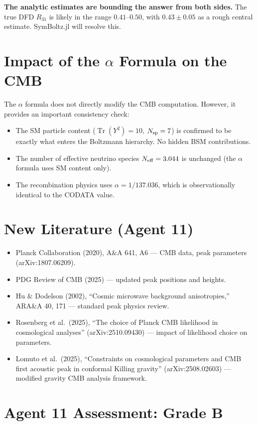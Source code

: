 \documentclass[11pt,a4paper]{article}
\newcommand{\Tr}{\operatorname{Tr}}
\begin{document}
\textbf{The analytic estimates are bounding the answer from both sides.} The true DFD $R_{31}$ is likely in the range $0.41$--$0.50$, with $0.43 \pm 0.05$ as a rough central estimate. SymBoltz.jl will resolve this.

\section{Impact of the $\alpha$ Formula on the CMB}

The $\alpha$ formula does not directly modify the CMB computation. However, it provides an important consistency check:
\begin{itemize}
\item The SM particle content ($\Tr(Y^2) = 10$, $N_{\rm sp} = 7$) is confirmed to be exactly what enters the Boltzmann hierarchy. No hidden BSM contributions.
\item The number of effective neutrino species $N_{\rm eff} = 3.044$ is unchanged (the $\alpha$ formula uses SM content only).
\item The recombination physics uses $\alpha = 1/137.036$, which is observationally identical to the CODATA value.
\end{itemize}

\section{New Literature (Agent 11)}

\begin{itemize}
\item Planck Collaboration (2020), A\&A 641, A6 --- CMB data, peak parameters (arXiv:1807.06209).
\item PDG Review of CMB (2025) --- updated peak positions and heights.
\item Hu \& Dodelson (2002), ``Cosmic microwave background anisotropies,'' ARA\&A 40, 171 --- standard peak physics review.
\item Rosenberg et al.\ (2025), ``The choice of Planck CMB likelihood in cosmological analyses'' (arXiv:2510.09430) --- impact of likelihood choice on parameters.
\item Lomuto et al.\ (2025), ``Constraints on cosmological parameters and CMB first acoustic peak in conformal Killing gravity'' (arXiv:2508.02603) --- modified gravity CMB analysis framework.
\end{itemize}

\section{Agent 11 Assessment: Grade B}
\end{document}

